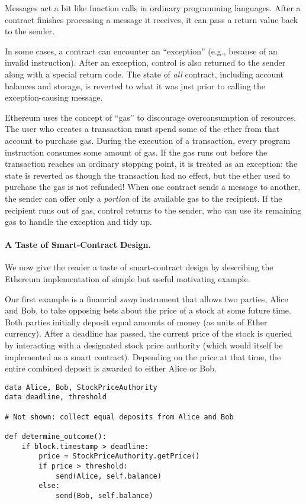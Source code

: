 \documentclass[10pt,twocolumn,letterpaper]{article}
\begin{document}
Messages act a bit like function calls in ordinary programming languages. After a contract finishes processing a message it receives, it can pass a return value back to the sender.

In some cases, a contract can encounter an ``exception'' (e.g., because of an invalid instruction). After an exception, control is also returned to the sender along with a special return code. The state of \emph{all} contract, including account balances and storage, is reverted to what it was just prior to calling the exception-causing message.

Ethereum uses the concept of ``gas'' to discourage overconsumption of resources. The user who creates a transaction must spend some of the ether from that account to purchase gas. During the execution of a transaction, every program instruction consumes some amount of gas. If the gas runs out before the transaction reaches an ordinary stopping point, it is treated as an exception: the state is reverted as though the transaction had no effect, but the ether used to purchase the gas is not refunded! When one contract sends a message to another, the sender can offer only a \emph{portion} of its available gas to the recipient. If the recipient runs out of gas, control returns to the sender, who can use its remaining gas to handle the exception and tidy up.


\paragraph{A Taste of Smart-Contract Design.}

We now give the reader a taste of smart-contract design by describing the Ethereum implementation of simple but useful motivating example. 

Our first example is a financial \emph{swap} instrument that allows two parties, Alice and Bob, to take opposing bets about the price of a stock at some future time. Both parties initially deposit equal amounts of money (as units of Ether currency). After a deadline has passed, the current price of the stock is queried by interacting with a designated stock price authority (which would itself be implemented as a smart contract). Depending on the price at that time, the entire combined deposit is awarded to either Alice or Bob.

\begin{mdframed}
\begin{verbatim}
data Alice, Bob, StockPriceAuthority
data deadline, threshold

# Not shown: collect equal deposits from Alice and Bob

def determine_outcome():
    if block.timestamp > deadline: 
        price = StockPriceAuthority.getPrice()
        if price > threshold:
            send(Alice, self.balance)
        else:
            send(Bob, self.balance)
\end{verbatim}
\end{mdframed}
\end{document}
